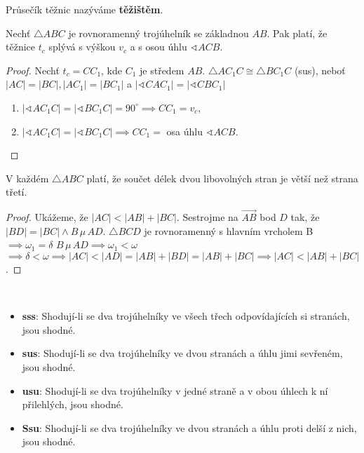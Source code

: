 \begin{definition}
Průsečík těžnic nazýváme \textbf{těžištěm}.
\end{definition}

\begin{veta}
  Nechť $\triangle ABC$ je rovnoramenný trojúhelník se základnou $AB$. Pak platí, že těžnice $t_c$ splývá s výškou $v_c$ a s osou úhlu $\sphericalangle ACB$.
\end{veta}

\begin{proof}
  Nechť $t_c = CC_1$, kde $C_1$ je středem $AB$.
  $\triangle AC_1 C \cong \triangle BC_1 C$ (sus), neboť $|AC| = |BC|, |AC_1| = |BC_1|$ a $|\sphericalangle CAC_1| = |\sphericalangle CBC_1|$
  \begin{enumerate}[$i.$]
    \item $|\sphericalangle AC_1 C| = |\sphericalangle BC_1 C| = 90^\circ \implies CC_1 = v_c$,
    \item $|\sphericalangle AC_1 C| = |\sphericalangle BC_1 C| \implies CC_1 = $ osa úhlu $\sphericalangle ACB$.\qedhere
  \end{enumerate}
\end{proof}

\begin{veta}
  V každém $\triangle ABC$ platí, že součet délek dvou libovolných stran je větší než strana třetí.
\end{veta}

\begin{proof}
  Ukážeme, že $|AC| < |AB| + |BC|$. Sestrojme na $\overrightarrow{AB}$ bod $D$ tak, že $|BD| = |BC| \land B\, \mu\, AD$. $\triangle BCD$ je rovnoramenný s hlavním vrcholem B $\implies \omega_1 = \delta$
  $B\, \mu\, AD \implies \omega_1 < \omega$
  $\implies \delta < \omega \implies |AC| < |AD| = |AB| + |BD| = |AB| + |BC| \implies |AC| < |AB| + |BC|$.
\end{proof}

\begin{veta}
  \,

  \begin{itemize}
    \item \textbf{sss}: Shodují-li se dva trojúhelníky ve všech třech odpovídajících si stranách, jsou shodné.
    \item \textbf{sus}: Shodují-li se dva trojúhelníky ve dvou stranách a úhlu jimi sevřeném, jsou shodné.
    \item \textbf{usu}: Shodují-li se dva trojúhelníky v jedné straně a v obou úhlech k ní přilehlých, jsou shodné.
    \item \textbf{Ssu}: Shodují-li se dva trojúhelníky ve dvou stranách a úhlu proti delší z nich, jsou shodné.
  \end{itemize}
\end{veta}

